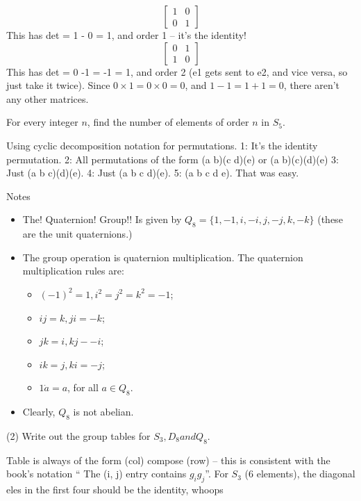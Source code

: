 \documentclass[1    0pt, answers]{exam} \renewcommand{\baselinestretch}{1.05}
\theoremstyle{plain}
\theoremstyle{definition}
\begin{document}
\begin{questions}
\begin{solution}
\[
\begin{bmatrix}
1 & 0 \\
0 & 1
\end{bmatrix} \] 
This has det = 1 - 0 = 1, and order 1 -- it's the identity!
\[
\begin{bmatrix}
0 & 1 \\
1 & 0
\end{bmatrix} \]
This has det = 0 -1 = -1 = 1, and order 2 (e1 gets sent to e2, and vice versa, so just take it twice).
Since $0 \times 1 = 0 \times 0 = 0$, and $1 - 1 = 1 + 1 = 0$, there aren't any other matrices.
\end{solution}

\question For every integer $n$, find the number of elements of order $n$ in $S_5$.


\begin{solution}
Using cyclic decomposition notation for permutations.
1: It's the identity permutation.
2: All permutations of the form (a b)(c d)(e) or (a b)(c)(d)(e)
3: Just (a b c)(d)(e).
4: Just (a b c d)(e).
5: (a b c d e).
That was easy.
\end{solution}

Notes
\begin{itemize}
\item The! Quaternion! Group!! Is given by $Q_8 = \{ 1, -1, i, -i, j, -j, k, -k \}$ (these are the unit quaternions.)
\item The group operation is quaternion multiplication. The quaternion multiplication rules are:
\begin{itemize}
    \item $(-1)^2 = 1, i^2 = j^2 = k^2 = -1$;
    \item $ij = k, ji = -k$;
    \item $jk = i, kj - -i$;
    \item $ik =j, ki = -j$;
    \item $1 \dot a = a$, for all $a \in Q_8$.
\end{itemize}
\item Clearly, $Q_8$ is not abelian.
\end{itemize}

\question (2) Write out the group tables for $S_3, D_8 and Q_8$.
\begin{solution}
Table is always of the form (col) compose (row) -- this is consistent with the book's notation
`` The (i, j) entry contains $g_i g_j$''.
\renewcommand\arraystretch{1.3}
\setlength\doublerulesep{0pt}
For $S_3$ (6 elements), the diagonal eles in the first four should be the identity, whoops\\
\pagebreak


\end{solution}
\end{questions}
\end{document}
